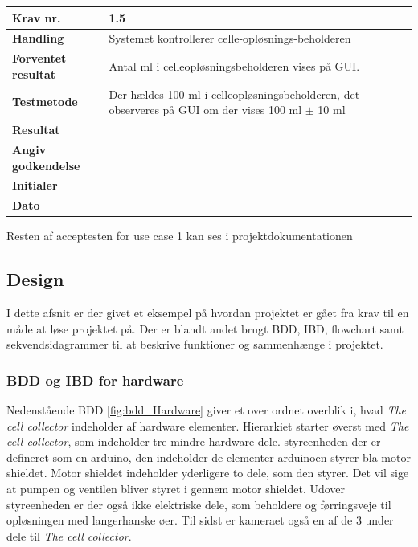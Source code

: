 	\begin{center}
		\begin{longtable}{ | m{4cm}| m{8.5cm}|} 
			\hline
			\textbf{Krav nr.} & 1.5    \\ 
			\hline
			\textbf{Handling} &  Systemet kontrollerer celle-opløsnings-beholderen  \\
			\hline
			\textbf{Forventet resultat} &  Antal ml i celleopløsningsbeholderen vises på GUI.  \\
			\hline
			\textbf{Testmetode}  & Der hældes 100 ml i celleopløsningsbeholderen, det observeres på GUI om der vises 100 ml $\pm$ 10 ml   \\
			\hline			
			\textbf{Resultat}  &    \\
			\hline
			\textbf{Angiv godkendelse} &     \\
			\hline
			\textbf{Initialer} &     \\
			\hline
			\textbf{Dato} &    \\
			\hline
		\end{longtable}
	\end{center}	
	
Resten af acceptesten for use case 1 kan ses i projektdokumentationen  

\subsection{Design}
\label{subsec:design}
I dette afsnit er der givet et eksempel på hvordan projektet er gået fra krav til en måde at løse projektet på. Der er blandt andet brugt BDD, IBD, flowchart samt sekvendsidagrammer til at beskrive funktioner og sammenhænge i projektet. 

\subsubsection{BDD og IBD for hardware}
Nedenstående BDD \ref{fig:bdd_Hardware} giver et over ordnet overblik i, hvad \textit{The cell collector} indeholder af hardware elementer. Hierarkiet starter øverst med \textit{The cell collector}, som indeholder tre mindre hardware dele. styreenheden der er defineret som en arduino, den indeholder de elementer arduinoen styrer bla motor shieldet. Motor shieldet indeholder yderligere to dele, som den styrer. Det vil sige at pumpen og ventilen bliver styret i gennem motor shieldet. Udover styreenheden er der også ikke elektriske dele, som beholdere og førringsveje til opløsningen med langerhanske øer. Til sidst er kameraet også en af de 3 under dele til \textit{The cell collector}.

